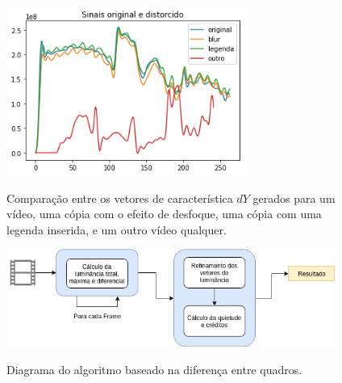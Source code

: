 \begin{figure}[h]
  \centering
  \caption{Comparação entre os vetores de característica $dY$ gerados para um vídeo, uma cópia com o efeito de desfoque, uma cópia com uma legenda inserida, e um outro vídeo qualquer.}
  \includegraphics[width=0.7\textwidth]{dados/figuras/dy}
  \label{fig:framediff-comparacao}
\end{figure}


 \begin{figure}[h]
      \centering
      \caption{Diagrama do algoritmo baseado na diferença entre quadros.}
      \includegraphics[width=0.96\textwidth]{dados/figuras/FrameDiff.png}
       	\label{fig:dia_framediff}
    \end{figure}  


    
